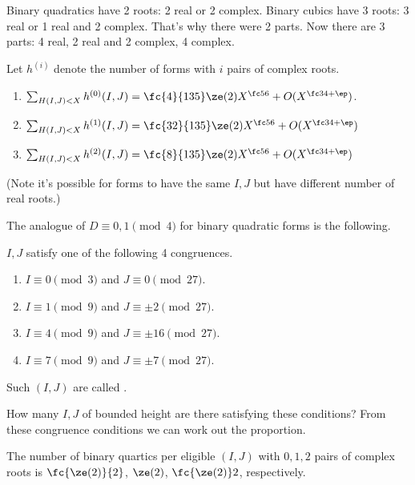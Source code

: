 Binary quadratics have 2 roots: 2 real or 2 complex. Binary cubics have 3 roots: 3 real or 1 real and 2 complex. That's why there were 2 parts. Now there are 3 parts: 4 real, 2 real and 2 complex, 4 complex.
\begin{thm}
Let $h^{(i)}$ denote the number of forms with $i$ pairs of complex roots.
\begin{enumerate}
\item
$\sum_{H(I,J)<X} h^{(0)} (I,J)=\fc{4}{135}\ze(2)X^{\fc 56} + O(X^{\fc 34+\ep})$.
\item
$\sum_{H(I,J)<X} h^{(1)} (I,J)=\fc{32}{135}\ze(2)X^{\fc 56} + O(X^{\fc 34+\ep})$
\item
$\sum_{H(I,J)<X} h^{(2)} (I,J)=\fc{8}{135}\ze(2)X^{\fc 56} + O(X^{\fc 34+\ep})$
\end{enumerate}
(Note it's possible for forms to have the same $I,J$ but have different number of real roots.)
\end{thm}
The analogue of $D\equiv 0,1\pmod4$ for binary quadratic forms is the following.
\begin{thm}
$I,J$ satisfy one of the following 4 congruences.
\begin{enumerate}
\item
$I\equiv 0 \pmod 3$ and $J\equiv 0 \pmod{27}$.
\item
$I\equiv 1\pmod 9$ and $J\equiv \pm 2\pmod{27}$.
\item
$I\equiv 4\pmod 9$ and $J\equiv \pm 16\pmod{27}$.
\item
$I\equiv 7\pmod 9$ and $J\equiv \pm 7\pmod{27}$.
\end{enumerate}
Such $(I,J)$ are called .
\end{thm}
How many $I,J$ of bounded height are there satisfying these conditions? %
From these congruence conditions we can work out the proportion. %
\begin{cor}
The number of binary quartics per eligible $(I,J)$ with $0,1,2$ pairs of complex roots is $\fc{\ze(2)}{2}$, $\ze(2)$, $\fc{\ze(2)}2$, respectively.
\end{cor}

